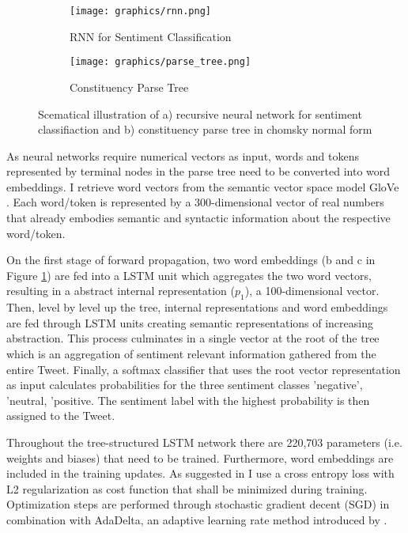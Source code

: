 \documentclass[a4paper,12pt]{article}%
\begin{document}
\begin{figure}
\captionsetup{justification=centering}
 \begin{subfigure}[b]{0.5\textwidth}
        \centering
        \texttt{[image: graphics/rnn.png]}
        \caption{RNN for Sentiment Classification\protect\footnotemark \label{fig:rnn}}
   \end{subfigure}
 \begin{subfigure}[b]{0.5\textwidth}
        \centering
        \texttt{[image: graphics/parse\_tree.png]}
        \caption{Constituency Parse Tree\protect\footnotemark \label{parse_tree}}
   \end{subfigure}
\caption[Scematical Illustration Recursive Neural Network and Parse Tree]{Scematical illustration of a) recursive neural network for sentiment classifiaction and b) constituency parse tree in chomsky normal form \label{fig:RNN_parse_tree}}
\end{figure}


As neural networks require numerical vectors as input, words and tokens represented by terminal nodes in the parse tree need to be converted into word embeddings. I retrieve word vectors from the semantic vector space model GloVe \citep{Pennington2014}. Each word/token is represented by a 300-dimensional vector of real numbers that already embodies semantic and syntactic information about the respective word/token.

On the first stage of forward propagation, two word embeddings (b and c in Figure \ref{fig:rnn}) are fed into a LSTM unit which aggregates the two word vectors, resulting in a abstract internal representation ($p_1$), a 100-dimensional vector. Then, level by level up the tree, internal representations and word embeddings are fed through LSTM units creating semantic representations of increasing abstraction. This process culminates in a single vector at the root of the tree which is an aggregation of sentiment relevant information gathered from the entire Tweet. Finally, a softmax classifier that uses the root vector representation as input calculates probabilities for the three sentiment classes 'negative', 'neutral, 'positive. The sentiment label with the highest probability is then assigned to the Tweet.

Throughout the tree-structured LSTM network there are 220,703 parameters (i.e. weights and biases) that need to be trained. Furthermore, word embeddings are included in the training updates. As suggested in \citet{Tai2015} I use a cross entropy loss with L2 regularization as cost function that shall be minimized during training. Optimization steps are performed through stochastic gradient decent (SGD) in combination with AdaDelta, an adaptive learning rate method introduced by \citet{Zeiler2012}.
\end{document}
